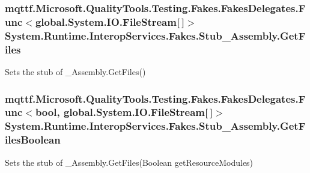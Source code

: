 \hypertarget{class_system_1_1_runtime_1_1_interop_services_1_1_fakes_1_1_stub___assembly_a71b2b09264df28badd9db891c8d124be}{
\subsubsection[{Get\-Files}]{\setlength{\rightskip}{0pt plus 5cm}mqttf.\-Microsoft.\-Quality\-Tools.\-Testing.\-Fakes.\-Fakes\-Delegates.\-Func$<$global.\-System.\-I\-O.\-File\-Stream\mbox{[}$\,$\mbox{]}$>$ System.\-Runtime.\-Interop\-Services.\-Fakes.\-Stub\-\_\-\-Assembly.\-Get\-Files}}\label{class_system_1_1_runtime_1_1_interop_services_1_1_fakes_1_1_stub___assembly_a71b2b09264df28badd9db891c8d124be}


Sets the stub of \-\_\-\-Assembly.\-Get\-Files()

\hypertarget{class_system_1_1_runtime_1_1_interop_services_1_1_fakes_1_1_stub___assembly_a839faeab64465e7b99483406bcec73a4}{
\subsubsection[{Get\-Files\-Boolean}]{\setlength{\rightskip}{0pt plus 5cm}mqttf.\-Microsoft.\-Quality\-Tools.\-Testing.\-Fakes.\-Fakes\-Delegates.\-Func$<$bool, global.\-System.\-I\-O.\-File\-Stream\mbox{[}$\,$\mbox{]}$>$ System.\-Runtime.\-Interop\-Services.\-Fakes.\-Stub\-\_\-\-Assembly.\-Get\-Files\-Boolean}}\label{class_system_1_1_runtime_1_1_interop_services_1_1_fakes_1_1_stub___assembly_a839faeab64465e7b99483406bcec73a4}


Sets the stub of \-\_\-\-Assembly.\-Get\-Files(\-Boolean get\-Resource\-Modules)

